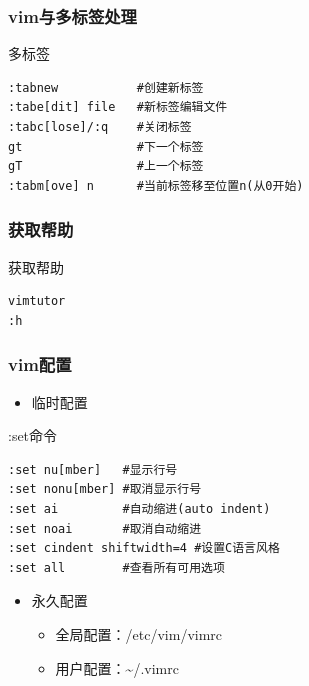 \documentclass[xcolor=svgnames,presentation]{beamer}
\begin{document}
\begin{frame}[fragile]
\frametitle{vim与多标签处理}
\label{sec-4-6-10}
\begin{exampleblock}{多标签}
\label{sec-4-6-10-1}


\begin{verbatim}
:tabnew           #创建新标签
:tabe[dit] file   #新标签编辑文件
:tabc[lose]/:q    #关闭标签
gt                #下一个标签
gT                #上一个标签
:tabm[ove] n      #当前标签移至位置n(从0开始)
\end{verbatim}
\end{exampleblock}
\end{frame}
\begin{frame}[fragile]
\frametitle{获取帮助}
\label{sec-4-6-11}
\begin{exampleblock}{获取帮助}
\label{sec-4-6-11-1}


\begin{verbatim}
vimtutor
:h
\end{verbatim}
\end{exampleblock}
\end{frame}
\begin{frame}[fragile]
\frametitle{vim配置}
\label{sec-4-6-12}
\begin{itemize}

\item 临时配置
\label{sec-4-6-12-1}%
\end{itemize} %
\begin{exampleblock}{:set命令}
\label{sec-4-6-12-2}


\begin{verbatim}
:set nu[mber]   #显示行号
:set nonu[mber] #取消显示行号
:set ai         #自动缩进(auto indent)
:set noai       #取消自动缩进
:set cindent shiftwidth=4 #设置C语言风格
:set all        #查看所有可用选项
\end{verbatim}
\end{exampleblock}
\begin{itemize}

\item 永久配置
\label{sec-4-6-12-3}%
\begin{itemize}

\item 全局配置：/etc/vim/vimrc
\label{sec-4-6-12-3-1}%

\item 用户配置：\~{}/.vimrc
\label{sec-4-6-12-3-2}%
\end{itemize} %
\end{itemize} %
\end{frame}
\end{document}

